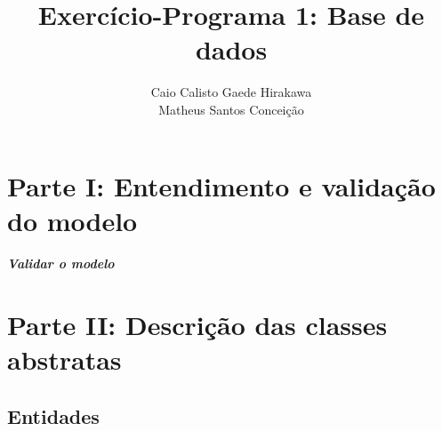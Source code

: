 \documentclass{report}
\author{Caio Calisto Gaede Hirakawa \\ Matheus Santos Conceição}
\title{Exercício-Programa 1: Base de dados}
\begin{document}
\maketitle
\tableofcontents
\chapter{Parte I: Entendimento e validação do modelo}
\paragraph{Validar o modelo}
\chapter{Parte II: Descrição das classes abstratas}

\section{Entidades}
\end{document}

